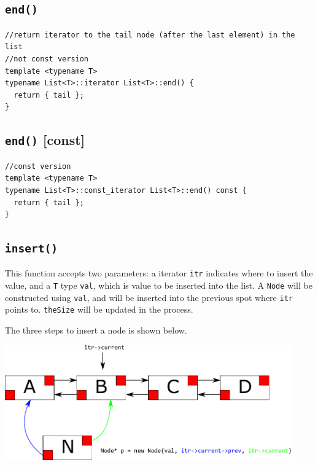 \documentclass[11pt]{book}
\begin{document}
\subsection{\texttt{end()}}
\label{sec:org5183556}
\begin{verbatim}
//return iterator to the tail node (after the last element) in the list 
//not const version 
template <typename T>
typename List<T>::iterator List<T>::end() {
  return { tail };
}
\end{verbatim}
\subsection{\texttt{end()} [const]}
\label{sec:org1a6150f}
\begin{verbatim}
//const version 
template <typename T>
typename List<T>::const_iterator List<T>::end() const {
  return { tail };
}
\end{verbatim}
\subsection{\texttt{insert()}}
\label{sec:org70538cb}
This function accepts two parameters: a iterator \texttt{itr} indicates where to insert the value, and a \texttt{T} type \texttt{val}, which is value to be inserted into the list. A \texttt{Node} will be constructed using \texttt{val}, and will be inserted into the previous spot where \texttt{itr} points to. \texttt{theSize} will be updated in the process.

The three steps to insert a node is shown below.

\begin{center}
\includegraphics[width=350pt]{./img/List-insert-1.pdf}
\end{center}
\end{document}
